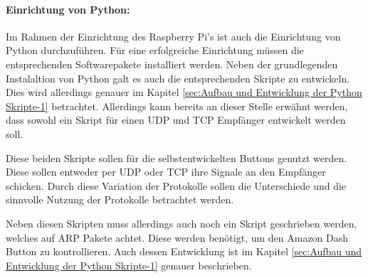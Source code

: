 \paragraph{Einrichtung von Python:}$\;$ \\
\label{sec:Python Skripte-1} 
Im Rahmen der Einrichtung des Raspberry Pi's ist auch die Einrichtung von Python durchzuführen. Für eine erfolgreiche Einrichtung müssen die entsprechenden Softwarepakete installiert werden.  Neben der grundlegenden Instalaltion von Python galt es auch die entsprechenden Skripte zu entwickeln. Dies wird allerdings genauer im Kapitel \ref{sec:Aufbau und Entwicklung der Python Skripte-1} betrachtet. Allerdings kann bereits an dieser Stelle erwähnt werden, dass sowohl ein Skript für einen UDP und TCP Empfänger entwickelt werden soll. 

Diese beiden Skripte sollen für die selbstentwickelten Buttons genutzt werden. Diese sollen entweder per UDP oder TCP ihre Signale an den Empfänger schicken. Durch diese Variation der Protokolle sollen die Unterschiede und die sinnvolle Nutzung der Protokolle betrachtet werden. 

Neben diesen Skripten muss allerdings auch noch ein Skript geschrieben werden, welches auf ARP Pakete achtet. Diese werden benötigt, um den Amazon Dash Button zu kontrollieren. Auch dessen Entwicklung ist im Kapitel \ref{sec:Aufbau und Entwicklung der Python Skripte-1} genauer beschrieben. 
